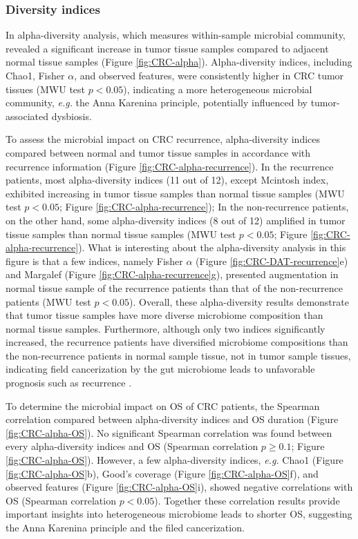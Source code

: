 \documentclass[11pt, a4paper, onecolumn, oneside]{report}
\begin{document}
            \subsubsection{Diversity indices}
                In alpha-diversity analysis, which measures within-sample microbial community, revealed a significant increase in tumor tissue samples compared to adjacent normal tissue samples (Figure \ref{fig:CRC-alpha}). Alpha-diversity indices, including Chao1, Fisher $\alpha$, and observed features, were consistently higher in CRC tumor tissues (MWU test $p < 0.05$), indicating a more heterogeneous microbial community, \textit{e.g.} the Anna Karenina principle, potentially influenced by tumor-associated dysbiosis.

                To assess the microbial impact on CRC recurrence, alpha-diversity indices compared between normal and tumor tissue samples in accordance with recurrence information (Figure \ref{fig:CRC-alpha-recurrence}). In the recurrence patients, most alpha-diversity indices (11 out of 12), except Mcintosh index, exhibited increasing in tumor tissue samples than normal tissue samples (MWU test $p < 0.05$; Figure \ref{fig:CRC-alpha-recurrence}); In the non-recurrence patients, on the other hand, some alpha-diversity indices (8 out of 12) amplified in tumor tissue samples than normal tissue samples (MWU test $p < 0.05$; Figure \ref{fig:CRC-alpha-recurrence}). What is interesting about the alpha-diversity analysis in this figure is that a few indices, namely Fisher $\alpha$ (Figure \ref{fig:CRC-DAT-recurrence}e) and Margalef (Figure \ref{fig:CRC-alpha-recurrence}g), presented augmentation in normal tissue sample of the recurrence patients than that of the non-recurrence patients (MWU test $p <0.05$). Overall, these alpha-diversity results demonstrate that tumor tissue samples have more diverse microbiome composition than normal tissue samples. Furthermore, although only two indices significantly increased, the recurrence patients have diversified microbiome compositions than the non-recurrence patients in normal sample tissue, not in tumor sample tissues, indicating field cancerization by the gut microbiome leads to unfavorable prognosis such as recurrence \cite{cancerization-1, cancerization-2}.

                To determine the microbial impact on OS of CRC patients, the Spearman correlation compared between alpha-diversity indices and OS duration (Figure \ref{fig:CRC-alpha-OS}). No significant Spearman correlation was found between every alpha-diversity indices and OS (Spearman correlation $p \ge 0.1$; Figure \ref{fig:CRC-alpha-OS}). However, a few alpha-diversity indices, \textit{e.g.} Chao1 (Figure \ref{fig:CRC-alpha-OS}b), Good's coverage (Figure \ref{fig:CRC-alpha-OS}f), and observed features (Figure \ref{fig:CRC-alpha-OS}i), showed negative correlations with OS (Spearman correlation $p < 0.05$). Together these correlation results provide important insights into heterogeneous microbiome leads to shorter OS, suggesting the Anna Karenina principle and the filed cancerization.
\end{document}

